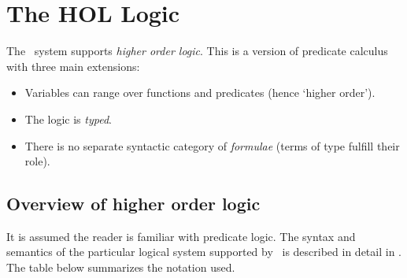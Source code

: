 \chapter{The HOL Logic}
\label{HOLlogic}

The \HOL\  system  supports {\it  higher order  logic}.   This is  a version of
predicate calculus with three main extensions:

\begin{itemize}
\item Variables can range over functions and predicates
(hence `higher order').
\item The logic is {\it typed}.
\item There is no separate syntactic category of {\it formulae\/}
(terms of type  fulfill their role).
\end{itemize}

\section{Overview of higher order logic}

It is assumed the reader is familiar with predicate logic.  The syntax
and semantics of the particular logical system supported by \HOL\ is
described in detail in \DESCRIPTION.  The table below summarizes the
notation used.

